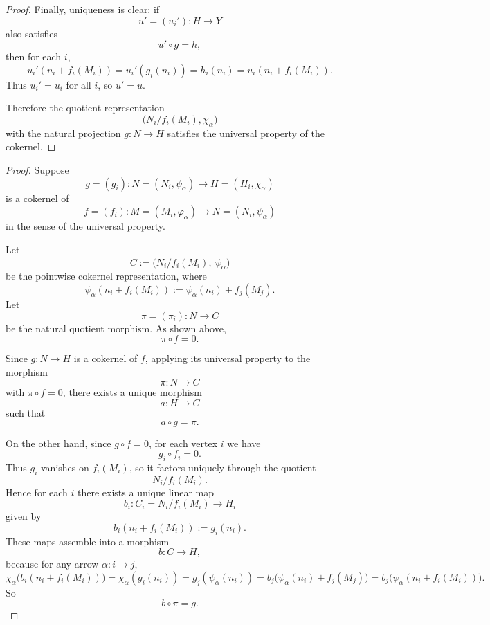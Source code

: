 \documentclass[11pt, a4paper]{report}
\begin{document}
\begin{proof}
    Finally, uniqueness is clear: if
    \[
    u'=(u_i'):H\to Y
    \]
    also satisfies
    \[
    u'\circ g=h,
    \]
    then for each $i$,
    \[
    u_i'(n_i+f_i(M_i))
    =u_i'(g_i(n_i))
    =h_i(n_i)
    =u_i(n_i+f_i(M_i)).
    \]
    Thus $u_i'=u_i$ for all $i$, so $u'=u$.
    
    Therefore the quotient representation
    \[
    \bigl(N_i/f_i(M_i),\chi_\alpha\bigr)
    \]
    with the natural projection $g:N\to H$ satisfies the universal property of the cokernel.
    \end{proof}

    \begin{proof}
        Suppose
        \[
        g=(g_i):N=(N_i,\psi_\alpha)\to H=(H_i,\chi_\alpha)
        \]
        is a cokernel of
        \[
        f=(f_i):M=(M_i,\varphi_\alpha)\to N=(N_i,\psi_\alpha)
        \]
        in the sense of the universal property.
        
        Let
        \[
        C:=\bigl(N_i/f_i(M_i),\ \overline{\psi}_\alpha\bigr)
        \]
        be the pointwise cokernel representation, where
        \[
        \overline{\psi}_\alpha(n_i+f_i(M_i))
        :=\psi_\alpha(n_i)+f_j(M_j).
        \]
        Let
        \[
        \pi=(\pi_i):N\to C
        \]
        be the natural quotient morphism. As shown above,
        \[
        \pi\circ f=0.
        \]
        
        Since $g:N\to H$ is a cokernel of $f$, applying its universal property to the morphism
        \[
        \pi:N\to C
        \]
        with $\pi\circ f=0$, there exists a unique morphism
        \[
        a:H\to C
        \]
        such that
        \[
        a\circ g=\pi.
        \]
        
        On the other hand, since $g\circ f=0$, for each vertex $i$ we have
        \[
        g_i\circ f_i=0.
        \]
        Thus $g_i$ vanishes on $f_i(M_i)$, so it factors uniquely through the quotient
        \[
        N_i/f_i(M_i).
        \]
        Hence for each $i$ there exists a unique linear map
        \[
        b_i:C_i=N_i/f_i(M_i)\to H_i
        \]
        given by
        \[
        b_i(n_i+f_i(M_i)):=g_i(n_i).
        \]
        These maps assemble into a morphism
        \[
        b:C\to H,
        \]
        because for any arrow $\alpha:i\to j$,
        \[
        \chi_\alpha\bigl(b_i(n_i+f_i(M_i))\bigr)
        =\chi_\alpha(g_i(n_i))
        =g_j(\psi_\alpha(n_i))
        =b_j\bigl(\psi_\alpha(n_i)+f_j(M_j)\bigr)
        =b_j\bigl(\overline{\psi}_\alpha(n_i+f_i(M_i))\bigr).
        \]
        So
        \[
        b\circ \pi=g.
        \]
        

\end{proof}
\end{document}
